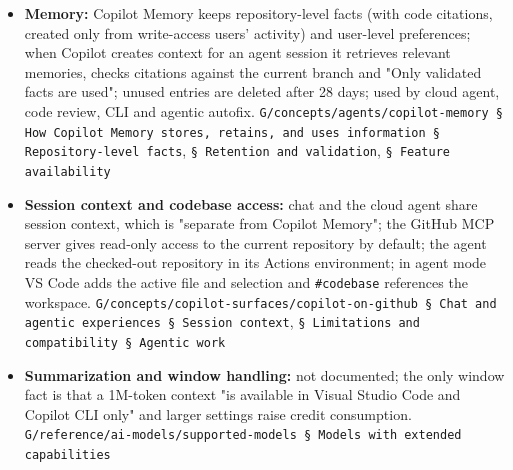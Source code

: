 \begin{itemize}
\item \textbf{Memory:} Copilot Memory keeps repository-level facts (with code citations, created only from write-access users' activity) and user-level preferences; when Copilot creates context for an agent session it retrieves relevant memories, checks citations against the current branch and "Only validated facts are used"; unused entries are deleted after 28 days; used by cloud agent, code review, CLI and agentic autofix. \texttt{G/\allowbreak{}concepts/\allowbreak{}agents/\allowbreak{}copilot-\allowbreak{}memory § How Copilot Memory stores, retains, and uses information § Repository-\allowbreak{}level facts}, \texttt{§ Retention and validation}, \texttt{§ Feature availability}
\item \textbf{Session context and codebase access:} chat and the cloud agent share session context, which is "separate from Copilot Memory"; the GitHub MCP server gives read-only access to the current repository by default; the agent reads the checked-out repository in its Actions environment; in agent mode VS Code adds the active file and selection and \texttt{\#codebase} references the workspace. \texttt{G/\allowbreak{}concepts/\allowbreak{}copilot-\allowbreak{}surfaces/\allowbreak{}copilot-\allowbreak{}on-\allowbreak{}github § Chat and agentic experiences § Session context}, \texttt{§ Limitations and compatibility § Agentic work}
\item \textbf{Summarization and window handling:} not documented; the only window fact is that a 1M-token context "is available in Visual Studio Code and Copilot CLI only" and larger settings raise credit consumption. \texttt{G/\allowbreak{}reference/\allowbreak{}ai-\allowbreak{}models/\allowbreak{}supported-\allowbreak{}models § Models with extended capabilities}
\end{itemize}

